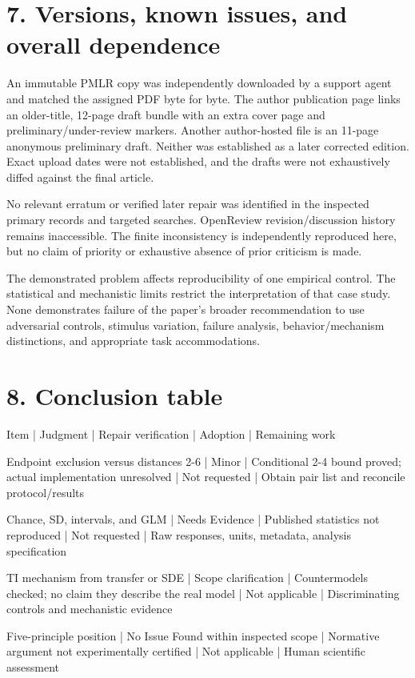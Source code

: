 \documentclass[10pt]{article}
\begin{document}
\section*{7. Versions, known issues, and overall dependence}
An immutable PMLR copy was independently downloaded by a support agent and matched the assigned PDF byte for byte. The author publication page links an older-title, 12-page draft bundle with an extra cover page and preliminary/under-review markers. Another author-hosted file is an 11-page anonymous preliminary draft. Neither was established as a later corrected edition. Exact upload dates were not established, and the drafts were not exhaustively diffed against the final article.\par
No relevant erratum or verified later repair was identified in the inspected primary records and targeted searches. OpenReview revision/discussion history remains inaccessible. The finite inconsistency is independently reproduced here, but no claim of priority or exhaustive absence of prior criticism is made.\par
The demonstrated problem affects reproducibility of one empirical control. The statistical and mechanistic limits restrict the interpretation of that case study. None demonstrates failure of the paper’s broader recommendation to use adversarial controls, stimulus variation, failure analysis, behavior/mechanism distinctions, and appropriate task accommodations.\par
\section*{8. Conclusion table}
Item | Judgment | Repair verification | Adoption | Remaining work\par
Endpoint exclusion versus distances 2-6 | Minor | Conditional 2-4 bound proved; actual implementation unresolved | Not requested | Obtain pair list and reconcile protocol/results\par
Chance, SD, intervals, and GLM | Needs Evidence | Published statistics not reproduced | Not requested | Raw responses, units, metadata, analysis specification\par
TI mechanism from transfer or SDE | Scope clarification | Countermodels checked; no claim they describe the real model | Not applicable | Discriminating controls and mechanistic evidence\par
Five-principle position | No Issue Found within inspected scope | Normative argument not experimentally certified | Not applicable | Human scientific assessment\par
\end{document}
